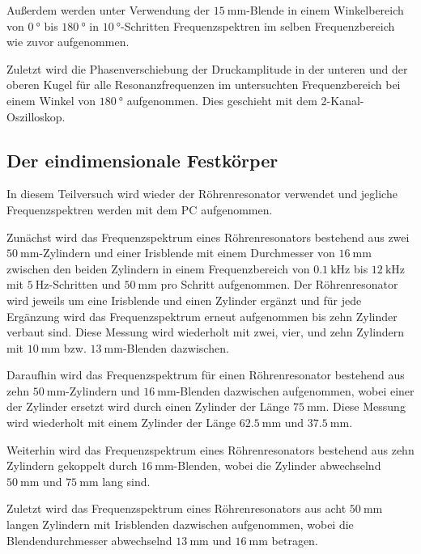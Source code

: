 Außerdem werden unter Verwendung der $\SI{15}{\milli\metre}$-Blende in einem Winkelbereich von $\SI{0}{\degree}$ bis $\SI{180}{\degree}$ in $\SI{10}{\degree}$-Schritten Frequenzspektren im selben Frequenzbereich wie zuvor aufgenommen.

Zuletzt wird die Phasenverschiebung der Druckamplitude in der unteren und der oberen Kugel für alle Resonanzfrequenzen im untersuchten Frequenzbereich bei einem Winkel von $\SI{180}{\degree}$ aufgenommen. Dies geschieht mit dem 2-Kanal-Oszilloskop.

\subsection{Der eindimensionale Festkörper}
In diesem Teilversuch wird wieder der Röhrenresonator verwendet und jegliche Frequenzspektren werden mit dem PC aufgenommen.

Zunächst wird das Frequenzspektrum eines Röhrenresonators bestehend aus zwei $\SI{50}{\milli\metre}$-Zylindern und einer Irisblende mit einem Durchmesser von $\SI{16}{\milli\metre}$ zwischen den beiden Zylindern in einem Frequenzbereich von $\SI{0.1}{\kilo\hertz}$ bis $\SI{12}{\kilo\hertz}$ mit $\SI{5}{\hertz}$-Schritten und $\SI{50}{\milli\metre}$ pro Schritt aufgenommen. Der Röhrenresonator wird jeweils um eine Irisblende und einen Zylinder ergänzt und für jede Ergänzung wird das Frequenzspektrum erneut aufgenommen bis zehn Zylinder verbaut sind.
Diese Messung wird wiederholt mit zwei, vier, und zehn Zylindern mit $\SI{10}{\milli\metre}$ bzw. $\SI{13}{\milli\metre}$-Blenden dazwischen.

Daraufhin wird das Frequenzspektrum für einen Röhrenresonator bestehend aus zehn $\SI{50}{\milli\metre}$-Zylindern und $\SI{16}{\milli\metre}$-Blenden dazwischen aufgenommen, wobei einer der Zylinder ersetzt wird durch einen Zylinder der Länge $\SI{75}{\milli\metre}$. Diese Messung wird wiederholt mit einem Zylinder der Länge $\SI{62.5}{\milli\metre}$ und $\SI{37.5}{\milli\metre}$.

Weiterhin wird das Frequenzspektrum eines Röhrenresonators bestehend aus zehn Zylindern gekoppelt durch $\SI{16}{\milli\metre}$-Blenden, wobei die Zylinder abwechselnd $\SI{50}{\milli\metre}$ und $\SI{75}{\milli\metre}$ lang sind.

Zuletzt wird das Frequenzspektrum eines Röhrenresonators aus acht $\SI{50}{\milli\metre}$ langen Zylindern mit Irisblenden dazwischen aufgenommen, wobei die Blendendurchmesser abwechselnd $\SI{13}{\milli\metre}$ und $\SI{16}{\milli\metre}$ betragen.
